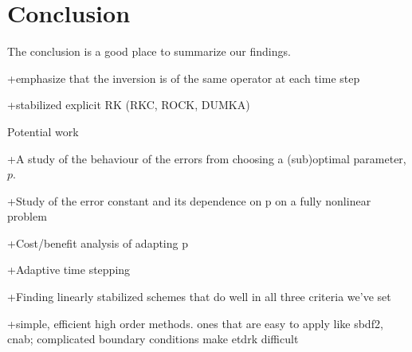 \chapter{Conclusion}
The conclusion is a good place to summarize our findings.

+emphasize that the inversion is of the same operator at each time step
	
+stabilized explicit RK (RKC, ROCK, DUMKA)

\noindent	
Potential work

+A study of the behaviour of the errors from choosing a (sub)optimal parameter, $p$.

+Study of the error constant and its dependence on p on a fully nonlinear problem 

+Cost/benefit analysis of adapting p

+Adaptive time stepping

+Finding linearly stabilized schemes that do well in all three criteria we've set

+simple, efficient high order methods. ones that are easy to apply like sbdf2, cnab; complicated boundary conditions make etdrk difficult	

